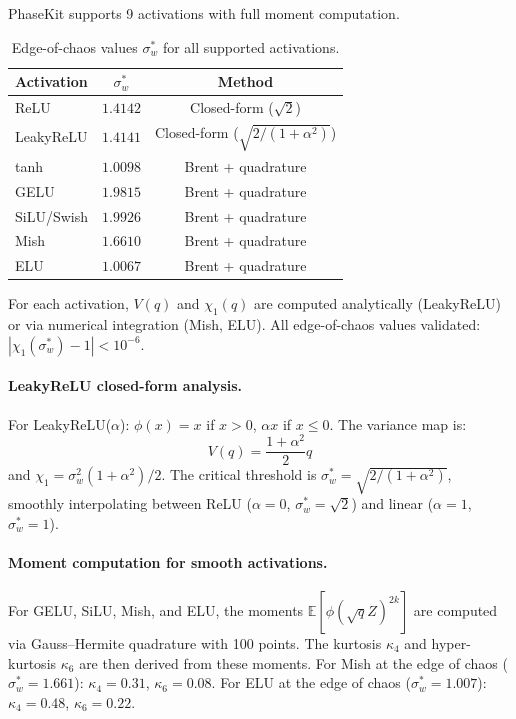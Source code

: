 \documentclass[10pt]{article}
\newcommand{\EE}{\mathbb{E}}
\begin{document}
PhaseKit supports 9 activations with full moment computation.

\begin{table}[h]
\centering
\caption{Edge-of-chaos values $\sigma_w^*$ for all supported activations.}
\label{tab:eoc-extended}
\small
\begin{tabular}{@{}lcc@{}}
\toprule
\textbf{Activation} & $\sigma_w^*$ & \textbf{Method} \\
\midrule
ReLU        & $1.4142$ & Closed-form ($\sqrt{2}$) \\
LeakyReLU   & $1.4141$ & Closed-form ($\sqrt{2/(1+\alpha^2)}$) \\
tanh        & $1.0098$ & Brent + quadrature \\
GELU        & $1.9815$ & Brent + quadrature \\
SiLU/Swish  & $1.9926$ & Brent + quadrature \\
Mish        & $1.6610$ & Brent + quadrature \\
ELU         & $1.0067$ & Brent + quadrature \\
\bottomrule
\end{tabular}
\end{table}

For each activation, $V(q)$ and $\chi_1(q)$ are computed analytically (LeakyReLU) or via numerical integration (Mish, ELU).
All edge-of-chaos values validated: $|\chi_1(\sigma_w^*) - 1| < 10^{-6}$.

\paragraph{LeakyReLU closed-form analysis.}
For LeakyReLU($\alpha$): $\phi(x) = x$ if $x > 0$, $\alpha x$ if $x \leq 0$.
The variance map is:
\begin{equation}
    V(q) = \frac{1+\alpha^2}{2} q
\end{equation}
and $\chi_1 = \sigma_w^2 (1+\alpha^2)/2$.
The critical threshold is $\sigma_w^* = \sqrt{2/(1+\alpha^2)}$, smoothly interpolating between ReLU ($\alpha=0$, $\sigma_w^*=\sqrt{2}$) and linear ($\alpha=1$, $\sigma_w^*=1$).

\paragraph{Moment computation for smooth activations.}
For GELU, SiLU, Mish, and ELU, the moments $\EE[\phi(\sqrt{q}Z)^{2k}]$ are computed via Gauss--Hermite quadrature with 100 points.
The kurtosis $\kappa_4$ and hyper-kurtosis $\kappa_6$ are then derived from these moments.
For Mish at the edge of chaos ($\sigma_w^* = 1.661$): $\kappa_4 = 0.31$, $\kappa_6 = 0.08$.
For ELU at the edge of chaos ($\sigma_w^* = 1.007$): $\kappa_4 = 0.48$, $\kappa_6 = 0.22$.
\end{document}
